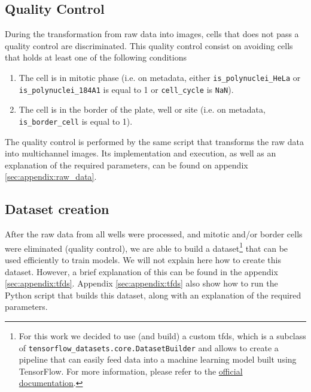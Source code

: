 \subsection{Quality Control}
\label{sec:dataset:data_pp:qc}

During the transformation from raw data into images, cells that does not pass a quality control are discriminated. This quality control consist on avoiding cells that holds at least one of the following conditions
\begin{enumerate}
  \item The cell is in mitotic phase (i.e. on metadata, either \texttt{is\_polynuclei\_HeLa} or \texttt{is\_polynuclei\_184A1} is equal to 1 or \texttt{cell\_cycle} is \texttt{NaN}).
  \item The cell is in the border of the plate, well or site (i.e. on metadata, \texttt{is\_border\_cell} is equal to 1).
\end{enumerate}

The quality control is performed by the same script that transforms the raw data into multichannel images. Its implementation and execution, as well as an explanation of the required parameters, can be found on appendix \ref{sec:appendix:raw_data}.

\subsection{Dataset creation}
\label{sec:dataset:data_pp:dataset_creation}

After the raw data from all wells were processed, and mitotic and/or border cells were eliminated (quality control), we are able to build a dataset\footnote{For this work we decided to use (and build) a custom \acrfull{tfds}, which is a subclass of \texttt{tensorflow\_datasets.core.DatasetBuilder} and allows to create a pipeline that can easily feed data into a machine learning model built using TensorFlow. For more information, please refer to the \href{https://www.tensorflow.org/datasets/add_dataset}{official documentation}.} that can be used efficiently to train models. We will not explain here how to create this dataset. However, a brief explanation of this can be found in the appendix \ref{sec:appendix:tfds}. Appendix \ref{sec:appendix:tfds} also show how to run the Python script that builds this dataset, along with an explanation of the required parameters.

